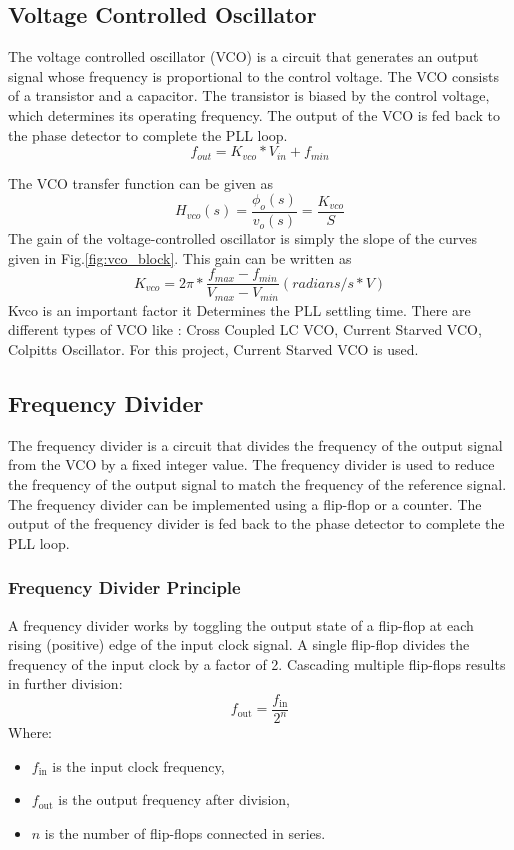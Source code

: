 \subsection{Voltage Controlled Oscillator}
The voltage controlled oscillator (VCO) is a circuit that generates an output signal whose frequency is proportional to the control voltage. The VCO consists of a transistor and a capacitor. The transistor is biased by the control voltage, which determines its operating frequency. The output of the VCO is fed back to the phase detector to complete the PLL loop.
\begin{equation}
	\label{eq:vco_char}
	f_{out} = K_{vco} * V_{in} + f_{min}
\end{equation}

The VCO transfer function can be given as
\begin{equation}
	\label{eq:vco_tf}
	H_{vco}(s) = \frac{\phi_{o}(s)}{v_{o}(s)} = \frac{K_{vco}}{S}
\end{equation}
The gain of the voltage-controlled oscillator is simply the slope of the curves given in Fig.\ref{fig:vco_block}. This gain can be written as
\begin{equation}
	\label{eq:vco_gain}
	K_{vco} = 2\pi  * \frac{f_{max} - f_{min}}{V_{max} - V_{min}}(radians/s * V)
\end{equation}
Kvco is an important factor it Determines the PLL settling time.
There are different types of VCO like : Cross Coupled LC VCO, Current Starved VCO, Colpitts Oscillator. For this project, Current Starved VCO is used.
\subsection{Frequency Divider}
The frequency divider is a circuit that divides the frequency of the output signal from the VCO by a fixed integer value. The frequency divider is used to reduce the frequency of the output signal to match the frequency of the reference signal. The frequency divider can be implemented using a flip-flop or a counter. The output of the frequency divider is fed back to the phase detector to complete the PLL loop.
\subsubsection*{Frequency Divider Principle}
A frequency divider works by toggling the output state of a flip-flop at each rising (positive) edge of the input clock signal. A single flip-flop divides the frequency of the input clock by a factor of 2. Cascading multiple flip-flops results in further division:
\begin{equation}
	\label{eq:freq_div}
	f_{\text{out}} = \frac{f_{\text{in}}}{2^n}
\end{equation}
Where:
\begin{itemize}
    \item $f_{\text{in}}$ is the input clock frequency,
    \item $f_{\text{out}}$ is the output frequency after division,
    \item $n$ is the number of flip-flops connected in series.
\end{itemize}
